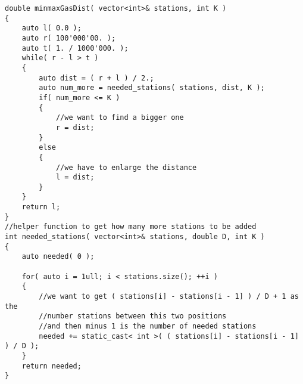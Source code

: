 \begin{lstlisting}[style=customc, caption={Binary Search}]
double minmaxGasDist( vector<int>& stations, int K )
{
    auto l( 0.0 );
    auto r( 100'000'00. );
    auto t( 1. / 1000'000. );
    while( r - l > t )
    {
        auto dist = ( r + l ) / 2.;
        auto num_more = needed_stations( stations, dist, K );
        if( num_more <= K )
        {
            //we want to find a bigger one
            r = dist;
        }
        else
        {
            //we have to enlarge the distance
            l = dist;
        }
    }
    return l;
}
//helper function to get how many more stations to be added
int needed_stations( vector<int>& stations, double D, int K )
{
    auto needed( 0 );

    for( auto i = 1ull; i < stations.size(); ++i )
    {
        //we want to get ( stations[i] - stations[i - 1] ) / D + 1 as the
        //number stations between this two positions
        //and then minus 1 is the number of needed stations
        needed += static_cast< int >( ( stations[i] - stations[i - 1] ) / D );
    }
    return needed;
}
\end{lstlisting}